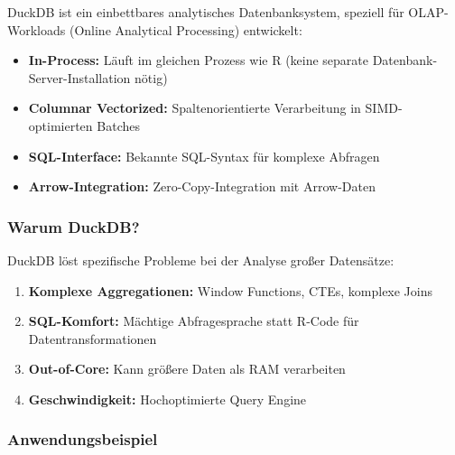 \documentclass[
  ngerman,
  10pt,
  twocolumn]{article}
\providecommand{\tightlist}{%
  \setlength{\itemsep}{0pt}\setlength{\parskip}{0pt}}
\begin{document}
DuckDB ist ein einbettbares analytisches Datenbanksystem, speziell für
OLAP-Workloads (Online Analytical Processing) entwickelt:

\begin{itemize}
\tightlist
\item
  \textbf{In-Process:} Läuft im gleichen Prozess wie R (keine separate
  Datenbank-Server-Installation nötig)
\item
  \textbf{Columnar Vectorized:} Spaltenorientierte Verarbeitung in
  SIMD-optimierten Batches
\item
  \textbf{SQL-Interface:} Bekannte SQL-Syntax für komplexe Abfragen
\item
  \textbf{Arrow-Integration:} Zero-Copy-Integration mit Arrow-Daten
\end{itemize}

\subsubsection{Warum DuckDB?}\label{warum-duckdb}

DuckDB löst spezifische Probleme bei der Analyse großer Datensätze:

\begin{enumerate}
\def\labelenumi{\arabic{enumi}.}
\tightlist
\item
  \textbf{Komplexe Aggregationen:} Window Functions, CTEs, komplexe
  Joins
\item
  \textbf{SQL-Komfort:} Mächtige Abfragesprache statt R-Code für
  Datentransformationen
\item
  \textbf{Out-of-Core:} Kann größere Daten als RAM verarbeiten
\item
  \textbf{Geschwindigkeit:} Hochoptimierte Query Engine
\end{enumerate}

\subsubsection{Anwendungsbeispiel}\label{anwendungsbeispiel}
\end{document}
